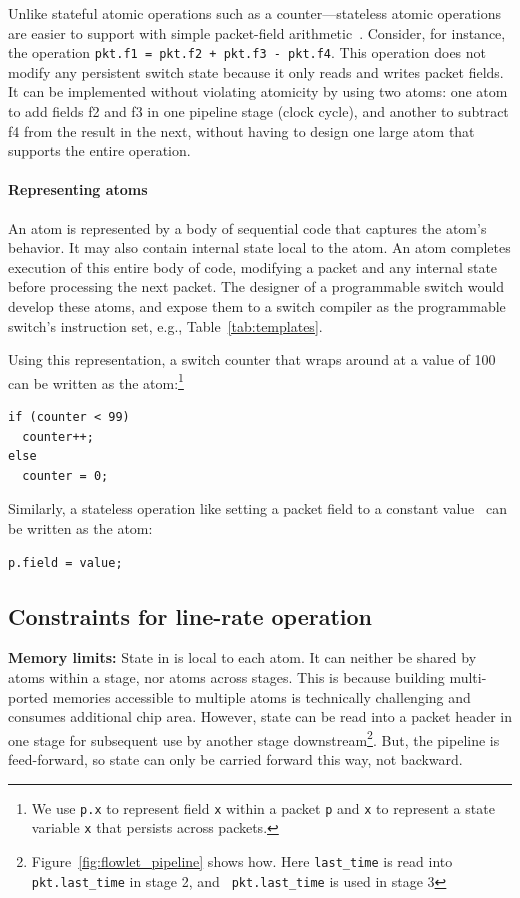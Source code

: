 Unlike stateful atomic operations such as a counter---stateless atomic
operations are easier to support with simple packet-field
arithmetic~\cite{rmt}.  Consider, for instance, the operation {\tt pkt.f1 =
pkt.f2 + pkt.f3 - pkt.f4}.  This operation does not modify any persistent
switch state because it only reads and writes packet fields. It can be
implemented without violating atomicity by using two atoms: one atom to add
fields f2 and f3 in one pipeline stage (clock cycle), and another to subtract
f4 from the result in the next, without having to design one large atom that
supports the entire operation.

\paragraph{Representing atoms}
An atom is represented by a body of sequential code that captures the atom's
behavior. It may also contain internal state local to the atom. An atom
completes execution of this entire body of code, modifying a packet and any
internal state before processing the next packet. The designer of a
programmable switch would develop these atoms, and expose them to a switch
compiler as the programmable switch's instruction set, e.g.,
Table~\ref{tab:templates}.

Using this representation, a switch counter that wraps around at a
value of 100 can be written as the atom:\footnote{We use {\tt p.x} to
  represent field {\tt x} within a packet {\tt p} and {\tt x} to
  represent a state variable {\tt x} that persists across packets.}
\begin{lstlisting}[style=customc, numbers=none, frame=none]
if (counter < 99)
  counter++;
else
  counter = 0;
\end{lstlisting}

Similarly, a stateless operation like setting a packet field to a constant
value~\cite{rmt} can be written as the atom:
\begin{lstlisting}[style=customc, numbers=none, frame=none]
  p.field = value;
\end{lstlisting}

\subsection{Constraints for line-rate operation}
\label{s:atomConstraints}

\textbf{Memory limits: } State in \absmachine is local to each atom.  It can
neither be shared by atoms within a stage, nor atoms across stages. This is
because building multi-ported memories accessible to multiple atoms
is technically challenging and consumes additional chip area. However, state
can be read into a packet header in one stage for subsequent use by another
stage downstream\footnote{Figure~\ref{fig:flowlet_pipeline} shows how. Here
{\tt last\_time} is read into {\tt pkt.last\_time} in stage 2, and {\tt
pkt.last\_time} is used in stage 3}.  But, the \absmachine pipeline is
feed-forward, so state can only be carried forward this way, not backward.

